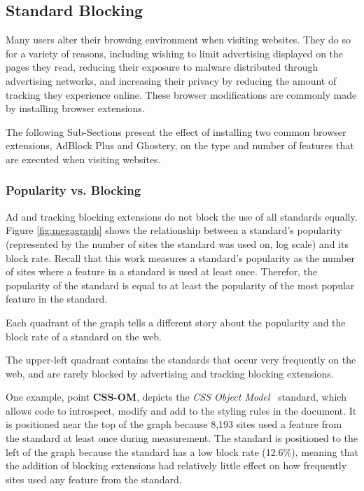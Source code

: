 \subsection{Standard Blocking}
\label{sec:results-feature-blocking}
Many users alter their browsing environment when visiting websites.  They do so
for a variety of reasons, including wishing to limit advertising displayed on
the pages they read, reducing their exposure to malware distributed through
advertising networks, and increasing their privacy by reducing the amount of
tracking they experience online.  These browser modifications are commonly
made by installing browser extensions.

The following Sub-Sections present the effect of installing two common browser
extensions, AdBlock Plus and Ghostery, on the type and number of features that
are executed when visiting websites.

\subsubsection{Popularity vs. Blocking}
\label{sec:results-feature-popularity}



Ad and tracking blocking extensions do not block the use of all standards
equally.  Figure \ref{fig:megagraph} shows the relationship between a
standard's popularity (represented by the number of sites the standard was used
on, log scale) and its block rate.  Recall that this work measures a standard's
popularity as the number of sites where a feature in a standard is used at
least once.  Therefor, the popularity of the standard is equal to at least the
popularity of the most popular feature in the standard.

Each quadrant of the graph tells a different story about the popularity and the
block rate of a standard on the web.

 The upper-left quadrant
contains the standards that occur very frequently on the web, and are rarely
blocked by advertising and tracking blocking extensions.

One example, point \textbf{CSS-OM}, depicts the \textit{CSS Object
Model}~\cite{cssomw3c} standard, which allows \JS code to introspect, modify
and add to the styling rules in the document.  It is positioned near the top of
the graph because 8,193 sites used a feature from the standard at least once
during measurement.  The standard is positioned to the left of the graph
because the standard has a low block rate (12.6\%), meaning that the addition
of blocking extensions had relatively little effect on how frequently sites
used any feature from the standard.

